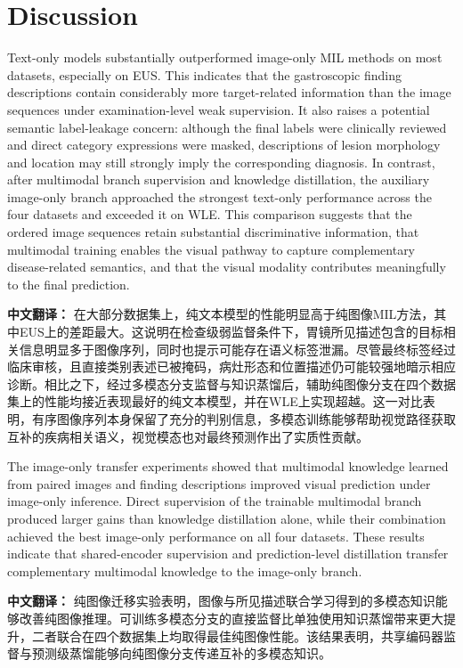 \documentclass[Afour,sagev,times]{sagej}
\begin{document}
\FloatBarrier

\section{Discussion}

Text-only models substantially outperformed image-only MIL methods on most datasets, especially on EUS. This indicates that the gastroscopic finding descriptions contain considerably more target-related information than the image sequences under examination-level weak supervision. It also raises a potential semantic label-leakage concern: although the final labels were clinically reviewed and direct category expressions were masked, descriptions of lesion morphology and location may still strongly imply the corresponding diagnosis. In contrast, after multimodal branch supervision and knowledge distillation, the auxiliary image-only branch approached the strongest text-only performance across the four datasets and exceeded it on WLE. This comparison suggests that the ordered image sequences retain substantial discriminative information, that multimodal training enables the visual pathway to capture complementary disease-related semantics, and that the visual modality contributes meaningfully to the final prediction.

\textbf{中文翻译：} 在大部分数据集上，纯文本模型的性能明显高于纯图像MIL方法，其中EUS上的差距最大。这说明在检查级弱监督条件下，胃镜所见描述包含的目标相关信息明显多于图像序列，同时也提示可能存在语义标签泄漏。尽管最终标签经过临床审核，且直接类别表述已被掩码，病灶形态和位置描述仍可能较强地暗示相应诊断。相比之下，经过多模态分支监督与知识蒸馏后，辅助纯图像分支在四个数据集上的性能均接近表现最好的纯文本模型，并在WLE上实现超越。这一对比表明，有序图像序列本身保留了充分的判别信息，多模态训练能够帮助视觉路径获取互补的疾病相关语义，视觉模态也对最终预测作出了实质性贡献。

The image-only transfer experiments showed that multimodal knowledge learned from paired images and finding descriptions improved visual prediction under image-only inference. Direct supervision of the trainable multimodal branch produced larger gains than knowledge distillation alone, while their combination achieved the best image-only performance on all four datasets. These results indicate that shared-encoder supervision and prediction-level distillation transfer complementary multimodal knowledge to the image-only branch.

\textbf{中文翻译：} 纯图像迁移实验表明，图像与所见描述联合学习得到的多模态知识能够改善纯图像推理。可训练多模态分支的直接监督比单独使用知识蒸馏带来更大提升，二者联合在四个数据集上均取得最佳纯图像性能。该结果表明，共享编码器监督与预测级蒸馏能够向纯图像分支传递互补的多模态知识。
\end{document}
